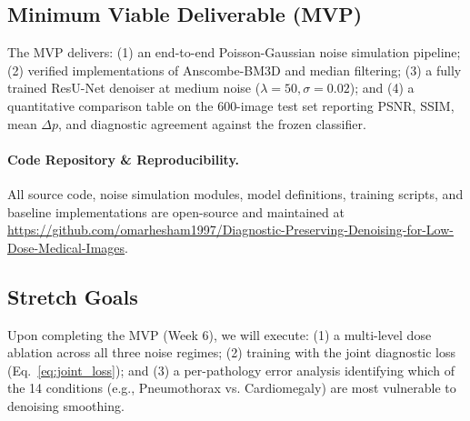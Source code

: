 \documentclass[11pt]{article}
\begin{document}
\subsection{Minimum Viable Deliverable (MVP)}
The MVP delivers: (1) an end-to-end Poisson-Gaussian noise simulation pipeline; (2) verified implementations of Anscombe-BM3D and median filtering; (3) a fully trained ResU-Net denoiser at medium noise ($\lambda = 50, \sigma = 0.02$); and (4) a quantitative comparison table on the 600-image test set reporting PSNR, SSIM, mean $\Delta p$, and diagnostic agreement against the frozen classifier.

\paragraph{Code Repository \& Reproducibility.}
All source code, noise simulation modules, model definitions, training scripts, and baseline implementations are open-source and maintained at \url{https://github.com/omarhesham1997/Diagnostic-Preserving-Denoising-for-Low-Dose-Medical-Images}.

\subsection{Stretch Goals}
Upon completing the MVP (Week 6), we will execute: (1) a multi-level dose ablation across all three noise regimes; (2) training with the joint diagnostic loss (Eq.~\ref{eq:joint_loss}); and (3) a per-pathology error analysis identifying which of the 14 conditions (e.g., Pneumothorax vs. Cardiomegaly) are most vulnerable to denoising smoothing.
\end{document}
